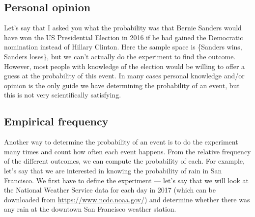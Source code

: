 \documentclass[]{book}
\newenvironment{Shaded}{\begin{snugshade}}{\end{snugshade}}
\newcommand{\KeywordTok}[1]{\textcolor[rgb]{0.13,0.29,0.53}{\textbf{#1}}}
\newcommand{\DataTypeTok}[1]{\textcolor[rgb]{0.13,0.29,0.53}{#1}}
\newcommand{\DecValTok}[1]{\textcolor[rgb]{0.00,0.00,0.81}{#1}}
\newcommand{\StringTok}[1]{\textcolor[rgb]{0.31,0.60,0.02}{#1}}
\newcommand{\CommentTok}[1]{\textcolor[rgb]{0.56,0.35,0.01}{\textit{#1}}}
\newcommand{\OperatorTok}[1]{\textcolor[rgb]{0.81,0.36,0.00}{\textbf{#1}}}
\newcommand{\NormalTok}[1]{#1}
\theoremstyle{definition}
\theoremstyle{definition}
\theoremstyle{definition}
\theoremstyle{remark}
\begin{document}
\subsection{Personal opinion}\label{personal-opinion}

Let's say that I asked you what the probability was that Bernie Sanders
would have won the US Presidential Election in 2016 if he had gained the
Democratic nomination instead of Hillary Clinton. Here the sample space
is \{Sanders wins, Sanders loses\}, but we can't actually do the
experiment to find the outcome. However, most people with knowledge of
the election would be willing to offer a guess at the probability of
this event. In many cases personal knowledge and/or opinion is the only
guide we have determining the probability of an event, but this is not
very scientifically satisfying.

\subsection{Empirical frequency}\label{empirical-frequency}

Another way to determine the probability of an event is to do the
experiment many times and count how often each event happens. From the
relative frequency of the different outcomes, we can compute the
probability of each. For example, let's say that we are interested in
knowing the probability of rain in San Francisco. We first have to
define the experiment --- let's say that we will look at the National
Weather Service data for each day in 2017 (which can be downloaded from
\url{https://www.ncdc.noaa.gov/}) and determine whether there was any
rain at the downtown San Francisco weather station.

\begin{Shaded}
\end{Shaded}
\end{document}
